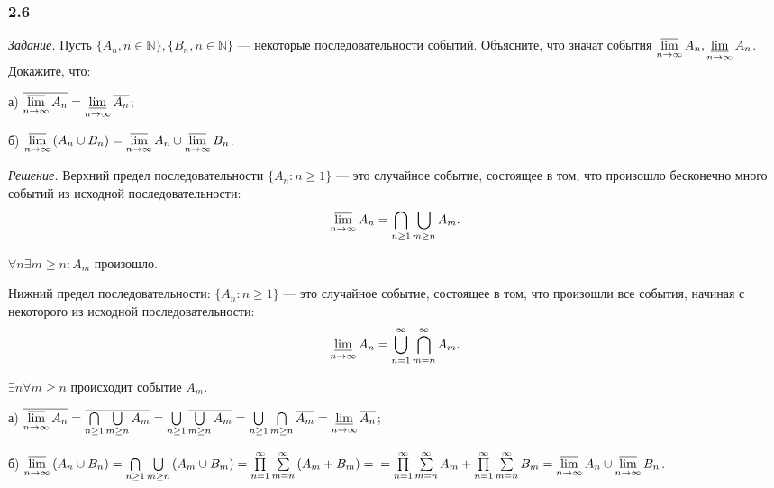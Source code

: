 \documentclass{book}
\begin{document}
\subsubsection*{2.6}

\textit{Задание.} Пусть $ \{ A_n, n \in \mathbb{N} \}, \{ B_n, n \in \mathbb{N} \} $ --- некоторые последовательности событий.
Объясните, что значат события $ \varlimsup \limits_{n \to \infty } A_n, \varliminf \limits_{n \to \infty } A_n$.
Докажите, что:

а) $ \overline{ \varlimsup \limits_{ n \to \infty } A_n } =
\varliminf \limits_{ n \to \infty } \overline{ A_n }$;

б) $ \varlimsup \limits_{ n \to \infty } \left( A_n \cup B_n \right) =
\varlimsup \limits_{ n \to \infty } A_n \cup \varlimsup \limits_{ n \to \infty } B_n $.

\textit{Решение.} Верхний предел последовательности $ \{ A_n : n \geq 1 \} $ ---
это случайное событие, состоящее в том, что произошло бесконечно много событий из исходной последовательности:
$$ \varlimsup \limits_{ n \to \infty } A_n =
\bigcap \limits_{ n \geq 1 } \bigcup \limits_{ m \geq n} A_m.$$

$ \forall n \exists m \geq n : A_m $ произошло.

Нижний предел последовательности:
$ \{ A_n : n \geq 1 \}$ --- это случайное событие, состоящее в том, что произошли все события, начиная с некоторого из исходной последовательности:
$$ \varliminf \limits_{ n \to \infty } A_n =
\bigcup \limits_{ n = 1 }^\infty \bigcap \limits_{ m = n }^\infty A_m.$$

$ \exists n \forall m \geq n $ происходит событие $A_m$.

а) $\overline{ \varlimsup \limits_{ n \to \infty } A_n } =
\overline{ \bigcap \limits_{ n \geq 1} \bigcup \limits_{ m \geq n} A_m } =
\bigcup \limits_{ n \geq 1} \overline{ \bigcup \limits_{ m \geq n} A_m } =
\bigcup \limits_{ n \geq 1} \bigcap \limits_{ m \geq n} \overline{ A_m } =
\varliminf \limits_{ n \to \infty} \overline{ A_n }$;

б) $\varlimsup \limits_{ n \to \infty } \left( A_n \cup B_n \right) =
\bigcap \limits_{ n \geq 1} \bigcup \limits_{ m \geq n} \left( A_m \cup B_m \right) =
\prod \limits_{ n = 1 }^\infty \sum \limits_{ m = n }^\infty \left( A_m + B_m \right) = \\
= \prod \limits_{ n = 1 }^\infty \sum \limits_{ m = n }^\infty A_m + \prod \limits_{ n = 1 }^\infty \sum \limits_{ m = n }^\infty B_m =
\varlimsup \limits_{ n \to \infty } A_n \cup \varlimsup \limits_{ n \to \infty } B_n $.
\end{document}
